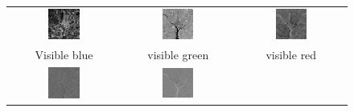 \documentclass[11pt,a4paper]{article}
\begin{document}
\begin{figure}[!htbp]
	\centering
	\begin{tabular}{ccc} 
		\includegraphics[width=0.3\textwidth]{pro10/PC/11_40_a}&
		\includegraphics[width=0.3\textwidth]{pro10/PC/11_40_b}&
		\includegraphics[width=0.3\textwidth]{pro10/PC/11_40_c}\\
		 Visible blue & visible green  & visible red\\
		\includegraphics[width=0.3\textwidth]{pro10/PC/11_40_d}&
		\includegraphics[width=0.3\textwidth]{pro10/PC/11_40_e}&

\end{tabular}
\end{figure}
\end{document}
